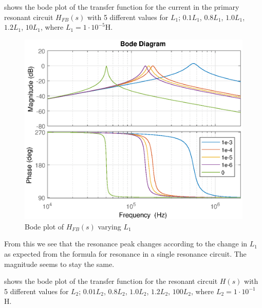  shows the bode plot of the transfer function for the current in the primary resonant circuit $H_{FB}(s)$ with 5 different values for $L_1$; $0.1 L_1$, $0.8 L_1$, $1.0 L_1$, $1.2 L_1$, $10 L_1$, where $L_1 = 1 \cdot 10^{-5}$H.
\begin{figure}[H]
    \centering
    \includegraphics[width=\textwidth]{img/FeedBackBode_L1.eps}
    \caption{Bode plot of $H_{FB}(s)$ varying $L_1$}
    \label{fig:fbbode_l1}
\end{figure}

From this we see that the resonance peak changes according to the change in $L_1$ as expected from the formula for resonance in a single resonance circuit. The magnitude seems to stay the same.

\newpage
{} shows the bode plot of the transfer function for the resonant circuit $H(s)$ with 5 different values for $L_2$; $0.01 L_2$, $0.8 L_2$, $1.0 L_2$, $1.2 L_2$, $100 L_2$, where $L_2 = 1 \cdot 10^{-1}$H.

